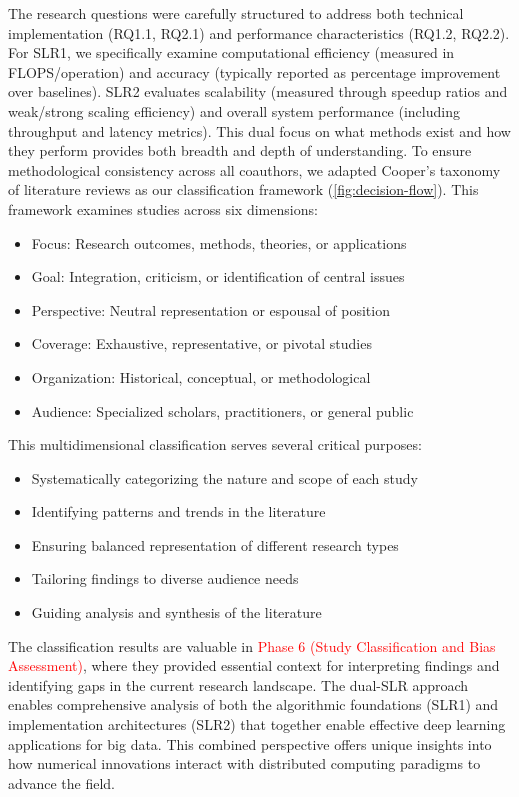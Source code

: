 \documentclass[acmsmall]{acmart}
\newcommand{\ATM}[1]{\textcolor{red}{#1}}
\begin{document}
The research questions were carefully structured to address both technical implementation (RQ1.1, RQ2.1) and performance characteristics (RQ1.2, RQ2.2). For SLR1, we specifically examine computational efficiency (measured in FLOPS/operation) and accuracy (typically reported as percentage improvement over baselines). SLR2 evaluates scalability (measured through speedup ratios and weak/strong scaling efficiency) and overall system performance (including throughput and latency metrics). This dual focus on what methods exist and how they perform provides both breadth and depth of understanding.
To ensure methodological consistency across all coauthors, we adapted Cooper's taxonomy of literature reviews \cite{cooper1988organizing} as our classification framework (\cref{fig:decision-flow}). This framework examines studies across six dimensions:
\begin{itemize}
    \item Focus: Research outcomes, methods, theories, or applications
    \item Goal: Integration, criticism, or identification of central issues
    \item Perspective: Neutral representation or espousal of position
    \item Coverage: Exhaustive, representative, or pivotal studies
    \item Organization: Historical, conceptual, or methodological
    \item Audience: Specialized scholars, practitioners, or general public
\end{itemize}
This multidimensional classification serves several critical purposes:
\begin{itemize}
    \item Systematically categorizing the nature and scope of each study
    \item Identifying patterns and trends in the literature
    \item Ensuring balanced representation of different research types
    \item Tailoring findings to diverse audience needs
    \item Guiding analysis and synthesis of the literature
\end{itemize}
The classification results are valuable in \ATM{Phase 6 (Study Classification and Bias Assessment)}, where they provided essential context for interpreting findings and identifying gaps in the current research landscape. The dual-SLR approach enables comprehensive analysis of both the algorithmic foundations (SLR1) and implementation architectures (SLR2) that together enable effective deep learning applications for big data. This combined perspective offers unique insights into how numerical innovations interact with distributed computing paradigms to advance the field.
\end{document}
